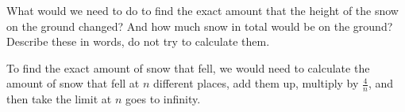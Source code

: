 \documentclass[nooutcomes]{ximera}
\renewenvironment{freeResponse}{
\ifhandout\setbox0\vbox\bgroup\else
\begin{trivlist}\item[\hskip \labelsep\bfseries Solution:\hspace{2ex}]
\fi}
{\ifhandout\egroup\else
\end{trivlist}
\fi}
\begin{document}
\begin{problem}
\begin{enumerate}
    
    

  \item  What would we need to do to find the exact amount that the height of the snow on the ground changed?  And how much snow in total would be on the ground?  Describe these in words, do not try to calculate them.
    \begin{freeResponse}
      To find the exact amount of snow that fell, we would need to calculate the amount of snow that fell at $n$ different places, add them up, multiply by $\frac{4}{n}$, and then take the limit at $n$ goes to infinity.
    \end{freeResponse}
  \end{enumerate}
\end{problem}
\end{document}
